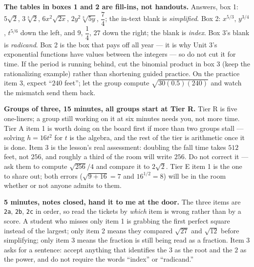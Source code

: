 \documentclass[10pt]{article}
\begin{document}
\begin{teachernote}
    \textbf{The tables in boxes 1 and 2 are fill-ins, not handouts.} Answers, box 1:
    $5\sqrt2$, $3\sqrt[3]2$, $6x^2\sqrt{2x}$, $2y^2\sqrt[3]{5y}$, $\dfrac74$; the in-text blank is
    \emph{simplified}. Box 2: $x^{5/3}$, $y^{3/4}$, $t^{5/6}$ down the left, and $9$, $\dfrac14$,
    $27$ down the right; the blank is \emph{index}. Box 3's blank is \emph{radicand}. Box 2 is the
    box that pays off all year --- it is why Unit 3's exponential functions have values between
    the integers --- so do not cut it for time. If the period is running behind, cut the binomial
    product in box 3 (keep the rationalizing example) rather than shortening guided practice. On
    the practice item 3, expect ``$240$ feet''; let the group compute $\sqrt{30(0.5)(240)}$ and
    watch the mismatch send them back.
\end{teachernote}

\begin{teachernote}
    \textbf{Groups of three, 15 minutes, all groups start at Tier R.} Tier R is five one-liners; a
    group still working on it at six minutes needs you, not more time. Tier A item 1 is worth
    doing on the board first if more than two groups stall --- solving $h=16t^2$ for $t$ is the
    algebra, and the rest of the tier is arithmetic once it is done. Item 3 is the lesson's real
    assessment: doubling the fall time takes $512$ feet, not $256$, and roughly a third of the
    room will write $256$. Do not correct it --- ask them to compute $\sqrt{256}/4$ and compare it
    to $2\sqrt2$. Tier E item 1 is the one to share out; both errors ($\sqrt{9+16}=7$ and
    $16^{1/2}=8$) will be in the room whether or not anyone admits to them.
\end{teachernote}

\begin{teachernote}
    \textbf{5 minutes, notes closed, hand it to me at the door.} The three items are
    \texttt{2a}, \texttt{2b}, \texttt{2c} in order, so read the tickets by \emph{which} item is
    wrong rather than by a score. A student who misses only item 1 is grabbing the first perfect
    square instead of the largest; only item 2 means they compared $\sqrt{27}$ and $\sqrt{12}$
    before simplifying; only item 3 means the fraction is still being read as a fraction. Item 3
    asks for a sentence: accept anything that identifies the $3$ as the root and the $2$ as the
    power, and do not require the words ``index'' or ``radicand.''
\end{teachernote}
\end{document}
